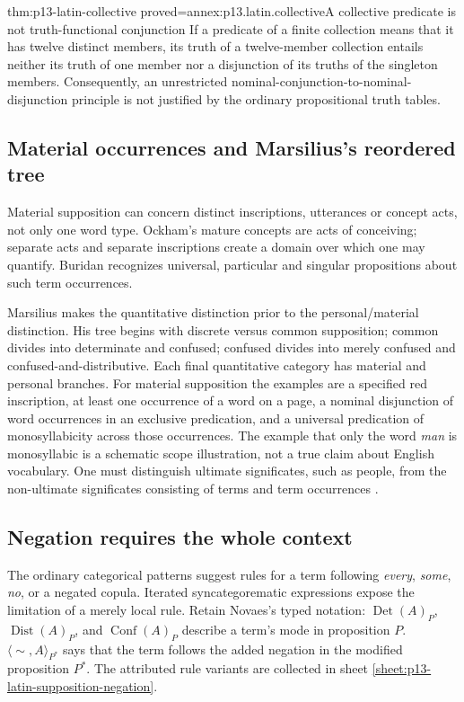 \begin{hblemma}{thm:p13-latin-collective}
 {proved=annex:p13.latin.collective}{A collective predicate is not truth-functional conjunction}
If a predicate of a finite collection means that it has twelve distinct
members, its truth of a twelve-member collection entails neither its truth
of one member nor a disjunction of its truths of the singleton members.
Consequently, an unrestricted nominal-conjunction-to-nominal-disjunction
principle is not justified by the ordinary propositional truth tables.
\end{hblemma}

\subsection{Material occurrences and Marsilius's reordered tree}

Material supposition can concern distinct inscriptions, utterances or
concept acts, not only one word type. Ockham's mature concepts are acts
of conceiving; separate acts and separate inscriptions create a domain
over which one may quantify. Buridan recognizes universal, particular
and singular propositions about such term occurrences.

Marsilius makes the quantitative distinction prior to the personal/material
distinction. His tree begins with discrete versus common supposition;
common divides into determinate and confused; confused divides into
merely confused and confused-and-distributive. Each final quantitative
category has material and personal branches.
For material supposition the examples are a specified red inscription,
at least one occurrence of a word on a page, a nominal disjunction of
word occurrences in an exclusive predication, and a universal predication
of monosyllabicity across those occurrences.
The example that only the word \emph{man} is monosyllabic is a schematic
scope illustration, not a true claim about English vocabulary.
One must distinguish ultimate significates, such as people, from the
non-ultimate significates consisting of terms and term occurrences
\cite[pp.~457--461]{DutilhNovaes2007FordhamChapter8}.

\subsection{Negation requires the whole context}

The ordinary categorical patterns suggest rules for a term following
\emph{every}, \emph{some}, \emph{no}, or a negated copula.
Iterated syncategorematic expressions expose the limitation of a merely
local rule. Retain Novaes's typed notation:
\(\operatorname{Det}(A)_P\), \(\operatorname{Dist}(A)_P\), and
\(\operatorname{Conf}(A)_P\) describe a term's mode in proposition \(P\).
\(\langle\sim,A\rangle_{P^*}\) says that the term follows the added
negation in the modified proposition \(P^*\).
The attributed rule variants are collected in
sheet \ref{sheet:p13-latin-supposition-negation}.

